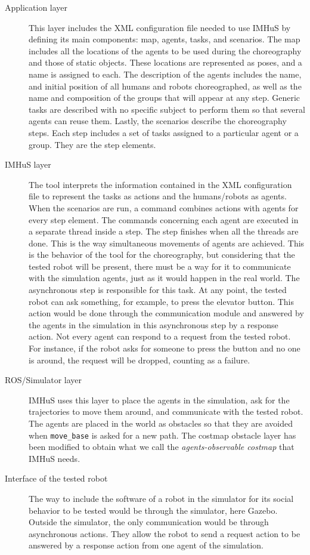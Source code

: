 \begin{description}
    \item[Application layer] This layer includes the XML configuration file needed to use IMHuS by defining its main components: map, agents, tasks, and scenarios. The map includes all the locations of the agents to be used during the choreography and those of static objects. These locations are represented as poses, and a name is assigned to each. The description of the agents includes the name, and initial position of all humans and robots choreographed, as well as the name and composition of the groups that will appear at any step. Generic tasks are described with no specific subject to perform them so that several agents can reuse them. Lastly, the scenarios describe the choreography steps. Each step includes a set of tasks assigned to a particular agent or a group. They are the step elements. 
    \item[IMHuS layer] The tool interprets the information contained in the XML configuration file to represent the tasks as actions and the humans/robots as agents. When the scenarios are run, a command combines actions with agents for every step element. The commands concerning each agent are executed in a separate thread inside a step. The step finishes when all the threads are done. This is the way simultaneous movements of agents are achieved. 
    This is the behavior of the tool for the choreography, but considering that the tested robot will be present, there must be a way for it to communicate with the simulation agents, just as it would happen in the real world. The asynchronous step is responsible for this task. At any point, the tested robot can ask something, for example, to press the elevator button. This action would be done through the communication module and answered by the agents in the simulation in this asynchronous step by a response action. Not every agent can respond to a request from the tested robot. For instance, if the robot asks for someone to press the button and no one is around, the request will be dropped, counting as a failure.
    \item[ROS/Simulator layer] IMHuS uses this layer to place the agents in the simulation, ask for the trajectories to move them around, and communicate with the tested robot. The agents are placed in the world as obstacles so that they are avoided when \texttt{move\_base} is asked for a new path. The costmap obstacle layer has been modified to obtain what we call the \textit{agents-observable costmap} that IMHuS needs.
    \item[Interface of the tested robot] The way to include the software of a robot in the simulator for its social behavior to be tested would be through the simulator, here Gazebo. Outside the simulator, the only communication would be through asynchronous actions. They allow the robot to send a request action to be answered by a response action from one agent of the simulation.
\end{description}


